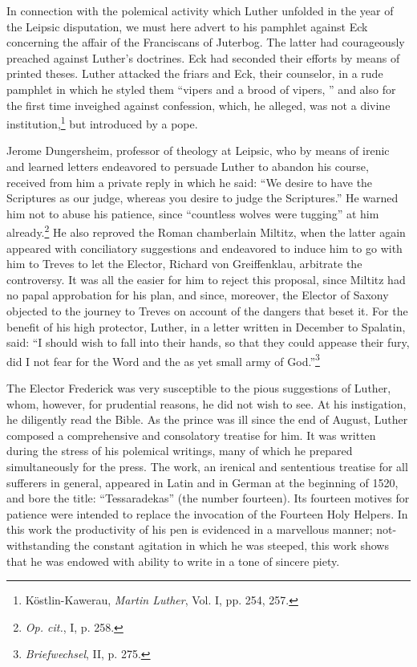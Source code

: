 In connection with the polemical activity which Luther unfolded
in the year of the Leipsic disputation, we must here advert to his
pamphlet against Eck concerning the affair of the Franciscans of
Juterbog. The latter had courageously preached against Luther’s
doctrines. Eck had seconded their efforts by means of printed theses.
Luther attacked the friars and Eck, their counselor, in a rude pamphlet
in which he styled them “vipers and a brood of vipers, ” and also for
the first time inveighed against confession, which, he alleged, was
not a divine institution,\footnote{Köstlin-Kawerau, \textit{Martin Luther}, Vol. I, pp. 254, 257.}
but introduced by a pope.

Jerome Dungersheim, professor of theology at Leipsic, who by
means of irenic and learned letters endeavored to persuade Luther to
abandon his course, received from him a private reply in which he
said: “We desire to have the Scriptures as our judge, whereas you
desire to judge the Scriptures.” He warned him not to abuse his
patience, since “countless wolves were tugging” at him already.\footnote{\textit{Op. cit.}, I, p. 258.}
He also reproved the Roman chamberlain Miltitz, when the latter
again appeared with conciliatory suggestions and endeavored to induce
him to go with him to Treves to let the Elector, Richard von
Greiffenklau, arbitrate the controversy. It was all the easier for him
to reject this proposal, since Miltitz had no papal approbation for
his plan, and since, moreover, the Elector of Saxony objected to the
journey to Treves on account of the dangers that beset it. For the
benefit of his high protector, Luther, in a letter written in December
to Spalatin, said: “I should wish to fall into their hands, so that
they could appease their fury, did I not fear for the Word and the
as yet small army of God.”\footnote{\textit{Briefwechsel}, II, p. 275.}

The Elector Frederick was very susceptible to the pious suggestions
of Luther, whom, however, for prudential reasons, he did not wish
to see. At his instigation, he diligently read the Bible. As the prince was
ill since the end of August, Luther composed a comprehensive and
consolatory treatise for him. It was written during the stress of his
polemical writings, many of which he prepared simultaneously
for the press. The work, an irenical and sententious treatise for all
sufferers in general, appeared in Latin and in German at the beginning
of 1520, and bore the title: “Tessaradekas” (the number fourteen).
Its fourteen motives for patience were intended to replace
the invocation of the Fourteen Holy Helpers. In this work the
productivity of his pen is evidenced in a marvellous manner; not-
withstanding the constant agitation in which he was steeped, this
work shows that he was endowed with ability to write in a tone of
sincere piety.

